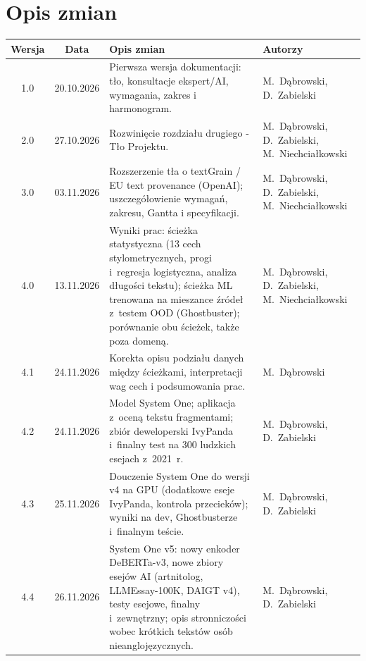 \section{Opis zmian}

\begin{table}[H]
\centering
\small
\begin{tabularx}{\textwidth}{|c|c|X|p{3.2cm}|}
\hline
\textbf{Wersja} & \textbf{Data} & \textbf{Opis zmian} & \textbf{Autorzy} \\
\hline
1.0 & 20.10.2026 & Pierwsza wersja dokumentacji: tło, konsultacje ekspert/AI, wymagania, zakres i harmonogram. & M.\ Dąbrowski, D.\ Zabielski \\
\hline
2.0 & 27.10.2026 & Rozwinięcie rozdziału drugiego - Tło Projektu. & M.\ Dąbrowski, D.\ Zabielski, M.\ Niechciałkowski \\
\hline
3.0 & 03.11.2026 & Rozszerzenie tła o textGrain / EU text provenance (OpenAI); uszczegółowienie wymagań, zakresu, Gantta i specyfikacji. & M.\ Dąbrowski, D.\ Zabielski, M.\ Niechciałkowski \\
\hline
4.0 & 13.11.2026 & Wyniki prac: ścieżka statystyczna (13 cech stylometrycznych, progi i~regresja logistyczna, analiza długości tekstu); ścieżka ML trenowana na mieszance źródeł z~testem OOD (Ghostbuster); porównanie obu ścieżek, także poza domeną. & M.\ Dąbrowski, D.\ Zabielski, M.\ Niechciałkowski \\
\hline
4.1 & 24.11.2026 & Korekta opisu podziału danych między ścieżkami, interpretacji wag cech i podsumowania prac. & M.\ Dąbrowski \\
\hline
4.2 & 24.11.2026 & Model System One; aplikacja z~oceną tekstu fragmentami; zbiór deweloperski IvyPanda i~finalny test na 300 ludzkich esejach z~2021~r. & M.\ Dąbrowski, D.\ Zabielski \\
\hline
4.3 & 25.11.2026 & Douczenie System One do wersji v4 na GPU (dodatkowe eseje IvyPanda, kontrola przecieków); wyniki na dev, Ghostbusterze i~finalnym teście. & M.\ Dąbrowski, D.\ Zabielski \\
\hline
4.4 & 26.11.2026 & System One v5: nowy enkoder DeBERTa-v3, nowe zbiory esejów AI (artnitolog, LLMEssay-100K, DAIGT v4), testy esejowe, finalny i~zewnętrzny; opis stronniczości wobec krótkich tekstów osób nieanglojęzycznych. & M.\ Dąbrowski, D.\ Zabielski \\
\hline
\end{tabularx}
\end{table}
